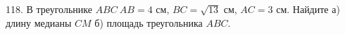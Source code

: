 118. В треугольнике $ABC\ AB=4$ см, $BC=\sqrt{13}$ см, $AC=3$ см. Найдите а) длину медианы $CM$ б) площадь треугольника $ABC.$\\
